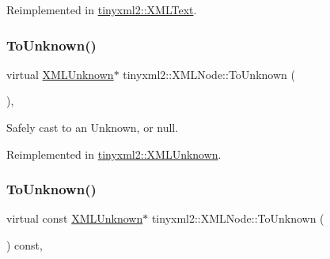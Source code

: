 Reimplemented in \mbox{\hyperlink{classtinyxml2_1_1_x_m_l_text_a671ce22c7c5ef378f1ce31e6f827b9e2}{tinyxml2\+::\+X\+M\+L\+Text}}.

\mbox{\label{classtinyxml2_1_1_x_m_l_node_a8675a74aa0ada6eccab0c77ef3e5b9bd}} 
\subsubsection{\texorpdfstring{To\+Unknown()}{ToUnknown()}\hspace{0.1cm}{\footnotesize\ttfamily [1/2]}}
{\footnotesize\ttfamily virtual \mbox{\hyperlink{classtinyxml2_1_1_x_m_l_unknown}{X\+M\+L\+Unknown}}$\ast$ tinyxml2\+::\+X\+M\+L\+Node\+::\+To\+Unknown (\begin{DoxyParamCaption}{ }\end{DoxyParamCaption})\hspace{0.3cm}{\ttfamily [inline]}, {\ttfamily [virtual]}}



Safely cast to an Unknown, or null. 



Reimplemented in \mbox{\hyperlink{classtinyxml2_1_1_x_m_l_unknown_af4374856421921cad578c8affae872b6}{tinyxml2\+::\+X\+M\+L\+Unknown}}.

\mbox{\label{classtinyxml2_1_1_x_m_l_node_af29ffd6cbe609b6fa04a705256150408}} 
\subsubsection{\texorpdfstring{To\+Unknown()}{ToUnknown()}\hspace{0.1cm}{\footnotesize\ttfamily [2/2]}}
{\footnotesize\ttfamily virtual const \mbox{\hyperlink{classtinyxml2_1_1_x_m_l_unknown}{X\+M\+L\+Unknown}}$\ast$ tinyxml2\+::\+X\+M\+L\+Node\+::\+To\+Unknown (\begin{DoxyParamCaption}{ }\end{DoxyParamCaption}) const\hspace{0.3cm}{\ttfamily [inline]}, {\ttfamily [virtual]}}



